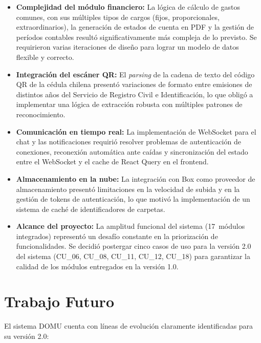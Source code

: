 \begin{itemize}
    \item \textbf{Complejidad del módulo financiero:} La lógica de cálculo de gastos comunes, con sus múltiples tipos de cargos (fijos, proporcionales, extraordinarios), la generación de estados de cuenta en PDF y la gestión de períodos contables resultó significativamente más compleja de lo previsto. Se requirieron varias iteraciones de diseño para lograr un modelo de datos flexible y correcto.

    \item \textbf{Integración del escáner QR:} El \textit{parsing} de la cadena de texto del código QR de la cédula chilena presentó variaciones de formato entre emisiones de distintos años del Servicio de Registro Civil e Identificación, lo que obligó a implementar una lógica de extracción robusta con múltiples patrones de reconocimiento.

    \item \textbf{Comunicación en tiempo real:} La implementación de WebSocket para el chat y las notificaciones requirió resolver problemas de autenticación de conexiones, reconexión automática ante caídas y sincronización del estado entre el WebSocket y el cache de React Query en el frontend.

    \item \textbf{Almacenamiento en la nube:} La integración con Box como proveedor de almacenamiento presentó limitaciones en la velocidad de subida y en la gestión de tokens de autenticación, lo que motivó la implementación de un sistema de caché de identificadores de carpetas.

    \item \textbf{Alcance del proyecto:} La amplitud funcional del sistema (17~módulos integrados) representó un desafío constante en la priorización de funcionalidades. Se decidió postergar cinco casos de uso para la versión 2.0 del sistema (CU\_06, CU\_08, CU\_11, CU\_12, CU\_18) para garantizar la calidad de los módulos entregados en la versión 1.0.
\end{itemize}

\section{Trabajo Futuro}

El sistema DOMU cuenta con líneas de evolución claramente identificadas para su versión 2.0:

